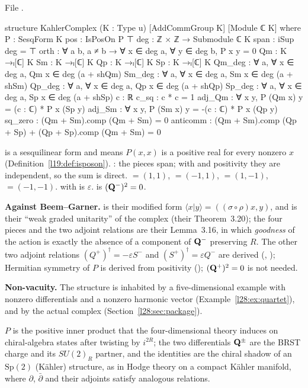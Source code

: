 \noindent File .
\begin{leancode}
structure KahlerComplex (K : Type u) [AddCommGroup K] [Module ℂ K] where
  P : SesqForm K
  pos : IsPosOn P ⊤
  deg : ℤ × ℤ → Submodule ℂ K
  span : iSup deg = ⊤
  orth : ∀ a b, a ≠ b → ∀ x ∈ deg a, ∀ y ∈ deg b, P x y = 0
  Qm : K →ₗ[ℂ] K
  Sm : K →ₗ[ℂ] K
  Qp : K →ₗ[ℂ] K
  Sp : K →ₗ[ℂ] K
  Qm_deg : ∀ a, ∀ x ∈ deg a, Qm x ∈ deg (a + shQm)
  Sm_deg : ∀ a, ∀ x ∈ deg a, Sm x ∈ deg (a + shSm)
  Qp_deg : ∀ a, ∀ x ∈ deg a, Qp x ∈ deg (a + shQp)
  Sp_deg : ∀ a, ∀ x ∈ deg a, Sp x ∈ deg (a + shSp)
  c : ℝ
  c_sq : c * c = 1
  adj_Qm : ∀ x y, P (Qm x) y = (c : ℂ) * P x (Sp y)
  adj_Sm : ∀ x y, P (Sm x) y = -(c : ℂ) * P x (Qp y)
  sq_zero : (Qm + Sm).comp (Qm + Sm) = 0
  anticomm : (Qm + Sm).comp (Qp + Sp) + (Qp + Sp).comp (Qm + Sm) = 0
\end{leancode}

\begin{dictionary}
 is a sesquilinear form and  means $P(x,x)$ is a positive real for every nonzero $x$
(Definition~\ref{l19:def:isposon}). : the pieces span; with  and positivity they are independent, so the sum is
direct. $=(1,1)$, $=(-1,1)$, $=(1,-1)$, $=(-1,-1)$.  with  is
$\varepsilon$.  is $(\mathbf Q^-)^2=0$.

\textbf{Against Beem--Garner.}  is their modified form $\langle x|y\rangle=((\sigma\circ\rho)x,y)$, and  is their ``weak
graded unitarity'' of the complex (their Theorem~3.20); the four pieces and the two adjoint relations are their Lemma~3.16, in which
\emph{goodness} of the action is exactly the absence of a component of $\mathbf Q^-$ preserving $R$. The other two adjoint relations
$(Q^+)^\dagger=-\varepsilon S^-$ and $(S^+)^\dagger=\varepsilon Q^-$ are derived (, ); Hermitian symmetry of $P$
is derived from positivity (); $(\mathbf Q^+)^2=0$ is not needed.

\textbf{Non-vacuity.} The structure is inhabited by a five-dimensional example with nonzero differentials and a nonzero harmonic vector
(Example~\ref{l28:ex:quartet}), and by the actual complex (Section~\ref{l28:sec:package}).
\end{dictionary}

\begin{physics}
$P$ is the positive inner product that the four-dimensional theory induces on chiral-algebra states after twisting by $i^{2R}$; the two
differentials $\mathbf Q^\pm$ are the BRST charge and its $SU(2)_R$ partner, and the identities are the chiral shadow of an $\mathrm{Sp}(2)$
(Kähler) structure, as in Hodge theory on a compact Kähler manifold, where $\partial$, $\bar\partial$ and their adjoints satisfy analogous
relations.
\end{physics}

